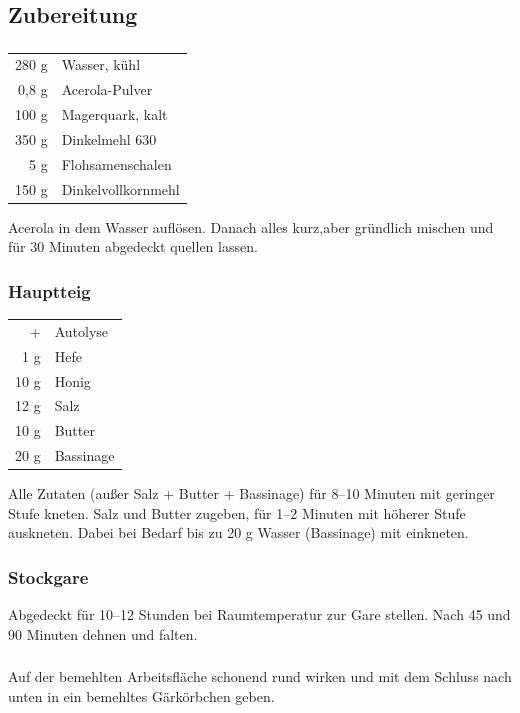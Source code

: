 \subsection*{Zubereitung}
    \subsubsection*{} 
    \begin{tabular}{r l}
        280 g & Wasser, kühl       \\
        0,8 g & Acerola-Pulver     \\
        100 g & Magerquark, kalt   \\
        350 g & Dinkelmehl  630    \\
          5 g & Flohsamenschalen   \\
        150 g & Dinkelvollkornmehl
    \end{tabular} 
    
         Acerola in dem Wasser auflösen. Danach alles kurz,aber gründlich mischen und für 30 Minuten abgedeckt quellen lassen.
    
    \subsubsection*{\Gls{Hauptteig}}  
    \begin{tabular}{r l}
           + & Autolyse  \\
         1 g & Hefe      \\
        10 g & Honig     \\
        12 g & Salz      \\
        10 g & Butter    \\
        20 g & Bassinage
    \end{tabular}
    
    Alle Zutaten (außer Salz + Butter + Bassinage) für 8–10 Minuten mit geringer Stufe kneten. Salz und Butter zugeben, für 1–2 Minuten mit höherer Stufe auskneten. Dabei bei Bedarf bis zu 20 g Wasser (Bassinage) mit einkneten.
    
    \subsubsection*{\Gls{Stockgare}}
    Abgedeckt für 10–12 Stunden bei Raumtemperatur zur Gare stellen. Nach 45 und 90 Minuten dehnen und falten.
    
    \subsubsection*{}
    Auf der bemehlten Arbeitsfläche schonend rund wirken und mit dem Schluss nach unten in ein bemehltes Gärkörbchen geben.
    
